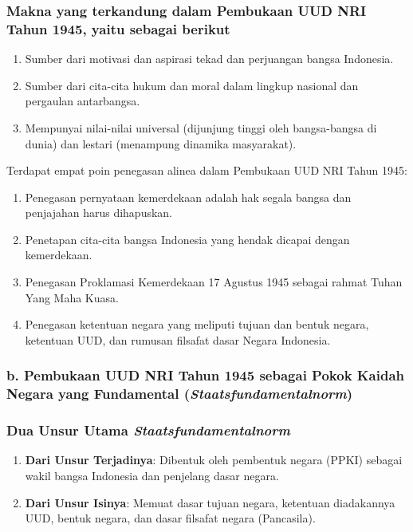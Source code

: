 \subsubsection{Makna yang terkandung dalam Pembukaan UUD NRI Tahun 1945, yaitu sebagai berikut}
\begin{enumerate}
    \item Sumber dari motivasi dan aspirasi tekad dan perjuangan bangsa Indonesia.
    \item Sumber dari cita-cita hukum dan moral dalam lingkup nasional dan pergaulan antarbangsa.
    \item Mempunyai nilai-nilai universal (dijunjung tinggi oleh bangsa-bangsa di dunia) dan lestari (menampung dinamika masyarakat).
\end{enumerate}

Terdapat empat poin penegasan alinea dalam Pembukaan UUD NRI Tahun 1945:
\begin{enumerate}
    \item Penegasan pernyataan kemerdekaan adalah hak segala bangsa dan penjajahan harus dihapuskan.
    \item Penetapan cita-cita bangsa Indonesia yang hendak dicapai dengan kemerdekaan.
    \item Penegasan Proklamasi Kemerdekaan 17 Agustus 1945 sebagai rahmat Tuhan Yang Maha Kuasa.
    \item Penegasan ketentuan negara yang meliputi tujuan dan bentuk negara, ketentuan UUD, dan rumusan filsafat dasar Negara Indonesia.
\end{enumerate}

\subsubsection{b. Pembukaan UUD NRI Tahun 1945 sebagai Pokok Kaidah Negara yang Fundamental (\textit{Staatsfundamentalnorm})}

\subsubsection{Dua Unsur Utama \textit{Staatsfundamentalnorm}}
\begin{enumerate}
    \item \textbf{Dari Unsur Terjadinya}: Dibentuk oleh pembentuk negara (PPKI) sebagai wakil bangsa Indonesia dan penjelang dasar negara.
    \item \textbf{Dari Unsur Isinya}: Memuat dasar tujuan negara, ketentuan diadakannya UUD, bentuk negara, dan dasar filsafat negara (Pancasila).
\end{enumerate}

